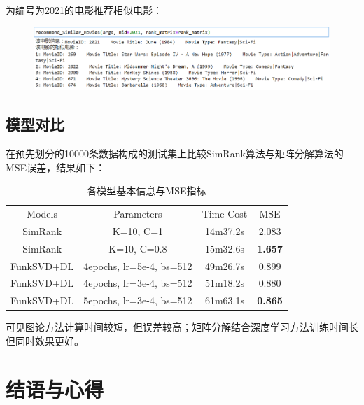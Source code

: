 \begin{spacing}{1.5}
\begin{figure}[h]
\end{figure}\par
\par
为编号为2021的电影推荐相似电影：\par
\begin{figure}[H]
\setlength{\abovecaptionskip}{0.0cm}
\setlength{\belowcaptionskip}{-0.cm}
\centering
\includegraphics[width=1\textwidth]{Figure/svd2.png}
\end{figure}\par
\par
\clearpage


\subsection{模型对比}
在预先划分的10000条数据构成的测试集上比较SimRank算法与矩阵分解算法的MSE误差，结果如下：\par
\begin{table}[h]
\centering
\caption{各模型基本信息与MSE指标}
\label{tab:1}
\begin{tabular}{cccc}
\toprule[2pt]
Models & Parameters & Time Cost & MSE  \\
\noalign{\smallskip}\hline\noalign{\smallskip}
SimRank & K=10, C=1 & 14m37.2s & 2.083 \\
SimRank & K=10, C=0.8& 15m32.6s & \textbf{1.657} \\
\hline\noalign{\smallskip}
FunkSVD+DL & 4epochs, lr=5e-4, bs=512 & 49m26.7s & 0.899 \\
FunkSVD+DL & 4epochs, lr=3e-4, bs=512 & 51m18.2s & 0.880 \\
FunkSVD+DL & 5epochs, lr=3e-4, bs=512 & 61m63.1s & \textbf{0.865} \\
\toprule[2pt]
\end{tabular}
\end{table}
可见图论方法计算时间较短，但误差较高；矩阵分解结合深度学习方法训练时间长但同时效果更好。
\end{spacing}

\section{结语与心得}
\xiaosi\begin{spacing}{1.5}


\end{spacing}
\clearpage


\printbibliography%
